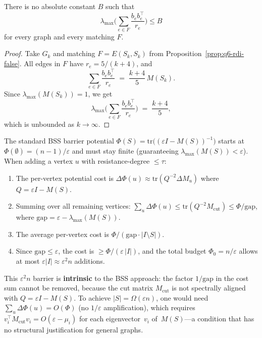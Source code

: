 \begin{corollary}\label{cor:q6-match-norm-false}
There is no absolute constant $B$ such that
\[
\lambda_{\max}\!\Big(\sum_{e\in F}\frac{b_e b_e^\top}{r_e}\Big)\le B
\]
for every graph and every matching $F$.
\end{corollary}

\begin{proof}
Take $G_k$ and matching $F=E(S_k,S_k)$ from
Proposition~\ref{prop:q6-rdi-false}.
All edges in $F$ have $r_e=5/(k+4)$, and
\[
\sum_{e\in F}\frac{b_e b_e^\top}{r_e}
\;=\;\frac{k+4}{5}\,M(S_k).
\]
Since $\lambda_{\max}(M(S_k))=1$, we get
\[
\lambda_{\max}\!\Big(\sum_{e\in F}\frac{b_e b_e^\top}{r_e}\Big)
\;=\;\frac{k+4}{5},
\]
which is unbounded as $k\to\infty$.
\end{proof}

\begin{remark}
The standard BSS barrier potential
$\Phi(S)=\mathrm{tr}\bigl((\varepsilon I-M(S))^{-1}\bigr)$ starts at
$\Phi(\emptyset)=(n-1)/\varepsilon$ and must stay finite
(guaranteeing $\lambda_{\max}(M(S))<\varepsilon$).
When adding a vertex $u$ with resistance-degree $\le\tau$:
\begin{enumerate}[nosep]
\item The per-vertex potential cost is
$\Delta\Phi(u)\approx\mathrm{tr}(Q^{-2}\Delta M_u)$
where $Q=\varepsilon I-M(S)$.
\item Summing over all remaining vertices:
$\sum_u\Delta\Phi(u)\le\mathrm{tr}(Q^{-2}M_{\mathrm{cut}})
\le\Phi/\mathrm{gap}$,
where $\mathrm{gap}=\varepsilon-\lambda_{\max}(M(S))$.
\item The average per-vertex cost is
$\Phi/(\mathrm{gap}\cdot|I\setminus S|)$.
\item Since $\mathrm{gap}\le\varepsilon$, the cost is
$\ge\Phi/(\varepsilon\,|I|)$, and the total budget $\Phi_0=n/\varepsilon$
allows at most $\varepsilon|I|\approx\varepsilon^2 n$ additions.
\end{enumerate}
This $\varepsilon^2 n$ barrier is \textbf{intrinsic} to the BSS approach:
the factor $1/\mathrm{gap}$ in the cost sum cannot be removed,
because the cut matrix $M_{\mathrm{cut}}$ is not spectrally aligned
with $Q=\varepsilon I-M(S)$. To achieve $|S|=\Omega(\varepsilon n)$,
one would need $\sum_u\Delta\Phi(u)=O(\Phi)$ (no $1/\varepsilon$
amplification), which requires
$v_i^\top M_{\mathrm{cut}}v_i=O(\varepsilon-\mu_i)$
for each eigenvector~$v_i$ of~$M(S)$---a condition that
has no structural justification for general graphs.
\end{remark}

